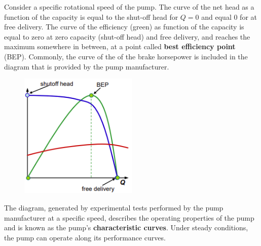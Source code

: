\documentclass[class=report, crop=false, 12pt,a4paper]{standalone}
\begin{document}
Consider a specific rotational speed of the pump. The curve of the net head as a function of the capacity is equal to the shut-off head for $Q=0$ and equal 0 for at free delivery. The curve of the efficiency (green) as function of the capacity is equal to zero at zero capacity (shut-off head) and free delivery, and reaches the maximum somewhere in between, at a point called \textbf{best efficiency point} (BEP). Commonly, the curve of the of the brake horsepower is included in the diagram that is provided by the pump manufacturer.
\begin{figure}[H]
  \centering
  \includegraphics[width= 0.5\textwidth]{../img/BEPgraph.png}
\end{figure}
The diagram, generated by experimental tests performed by the pump manufacturer at a specific speed, describes the operating properties of the pump and is known as the pump's \textbf{characteristic curves}. Under steady conditions, the pump can operate along its performance curves.
\end{document}
